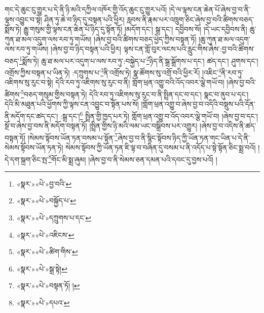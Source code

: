 གང་དེ་ཆུང་ངུ་གྱུར་པ་དེ་ནི་ཉི་མའི་དཀྱིལ་འཁོར་གྱི་འོད་ཆུང་ངུ་གྱུར་པའོ། །དེ་ལ་ལྟས་ངན་ཆེན་པོ་ཞེས་བྱ་བ་ནི་ལྟས་འབྱུང་བ་སྟེ། ཤིན་ཏུ་ཆེ་བ་ཉིད་དུ་བསྟན་པའི་ཕྱིར། རླབས་ནི་རྣམ་པར་འཁྲུག་ཅིང་ཞེས་བྱ་བའི་ཚིགས་བཅད་སྨོས་ཏེ། རྒྱུ་གསུམ་གྱི་ལྟས་ངན་ཆེན་པོ་ཉིད་དུ་སྟོན་ཏོ། །མདོག་དང་། སྒྲ་དང་། དབྱིབས་སོ། །དེ་ཡང་དབྱིབས་ནི། ཆུ་ཀུན་ཐ་མལ་འདུག་ལས་རབ་ཏུ་གཡོས། །ཞེས་བྱ་བའི་ཚིགས་བཅད་ཕྱེད་ཀྱིས་བསྟན་ཏོ། །ཆུ་ཀུན་ཐ་མལ་འདུག་ལས་རབ་ཏུ་གཡོས། །ཞེས་བྱ་བ་ཉིད་བསྟན་པའི་ཕྱིར། ལྟས་ངན་གློ་བུར་ལངས་པའི་རླུང་གིས་ཞེས་:བྱ་བའི་ཚིགས་བཅད་\footnote{«སྣར་»«པེ་»བྱ་བའི་}སྨོས་ཏེ། ཆུ་ཐ་མལ་པར་འདུག་པ་ལས་རབ་ཏུ་:བསྐྱེད་པ་\footnote{«སྣར་»«པེ་»བསྐྱོད་པ་}ཉིད་ནི་སྒྲ་སྒྲོགས་པ་དང་། ཚད་དང་། ཤུགས་དང་། འགྲོས་ཀྱིས་བསྟན་པ་ཡིན་ཏེ། :དཀྲུགས་པ་\footnote{«སྣར་»«པེ་»དཀྲུགས་པ་དང་}ནི་འགྲོས་ཏེ། སྣ་ཚོགས་སུ་འགྲོ་བའི་ཕྱིར་རོ། །འཇིང་\footnote{«སྣར་»«པེ་»འཇིངས་}ནི་རབ་ཏུ་འཇིགས་སུ་རུང་བ་སྟེ། དེའི་རབ་ཏུ་འཇིགས་སུ་རུང་བ་ནི། གློག་ཕྲན་འགྱུ་བའི་འོད་འབར་ལྕེ་གཡོ་བ། །ཞེས་བྱ་བའི་ཚིགས་\footnote{«སྣར་»«པེ་»ཚིག་གིས་}བཅད་གསུམ་གྱིས་བསྟན་ཏེ། དེའི་རབ་ཏུ་འཇིགས་སུ་རུང་བ་ནི་སྤྲིན་དང་བ་དང་། སྣང་བ་ནུབ་པ་དང་། དེའི་མི་མཐུན་པའི་ཕྱོགས་ཀྱི་ལྟས་ངན་འབྱུང་བ་སྟོན་པས་སོ། །གློག་ཕྲན་འགྱུ་བ་ཞེས་བྱ་བ་འདིའི་བསྡུས་པའི་དོན་ནི་མདོག་དང་ཚད་དང་། :སྒྲ་དང་།\footnote{«སྣར་»«པེ་»སྒྲ་སྟེ།} སྤྲིན་གྱི་ཁྱད་པར་ཏེ། གློག་ཕྲན་འགྱུ་བ་འོད་འབར་ལྕེ་གཡོ་བ། །ཞེས་བྱ་བ་དང་། སྔོ་བ་ཞེས་བྱ་བས་ནི་མདོག་བསྟན་ཏོ། །སྤྲིན་གྱིས་ཉི་མའི་ལམ་ཡང་བསྒྲིབས་པར་འགྱུར། །ཞེས་བྱ་བ་འདིས་ནི་ཚད་བསྟན་ཏོ། །སེམས་སྟོབས་ཡོན་ཏན་བསམ་པ་སྟོན་\footnote{«སྣར་»«པེ་»བསྟན་ཏོ། །}ཞེས་བྱ་བ་ནི་སྙིང་སྟོབས་ཉིད་ཀྱི་ཡོན་ཏན་གང་ཡིན་པ་དེ་ནི་སེམས་སྟོབས་ཡོན་ཏན་ཏེ། སེམས་སྟོབས་ཀྱི་ཡོན་ཏན་ཇི་ལྟ་བ་བཞིན་དུ་བསམ་པ་ནི་འདོད་པ་སྟེ་སྟོན་ཅིང་སྨྲ་བའོ། །དེ་དག་སྐྲག་ཅིང་སྤ་\footnote{«སྣར་»«པེ་»དཔའ་}གོང་མི་སྨྲ་ཞུམ། །ཞེས་བྱ་བ་ནི་སེམས་ཅན་དམན་པའི་དབང་དུ་བྱས་པའོ། །
